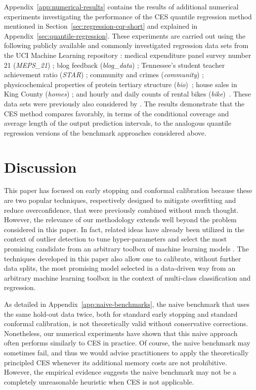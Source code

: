 Appendix~\ref{app:numerical-results} contains the results of additional numerical experiments investigating the performance of the CES quantile regression method mentioned in Section~\ref{sec:regression-cqr-short} and explained in Appendix~\ref{sec:quantile-regression}.
These experiments are carried out using the following publicly available and commonly investigated regression data sets from the UCI Machine Learning repository \cite{Pinar2012}: medical expenditure panel survey number 21 ({\em MEPS\_21}) \cite{meps_21}; blog feedback ({\em blog\_data}) \cite{blog_data}; Tennessee’s student teacher achievement ratio ({\em STAR}) \cite{star}; community and crimes ({\em community}) \cite{community}; physicochemical properties of protein tertiary structure ({\em bio})~\cite{data-bio}; house sales in King County ({\em homes}) \cite{homes}; and hourly and daily counts of rental bikes ({\em bike})~\cite{data-bike}. These data sets were previously also considered by \citet{romano2019conformalized}.
The results demonstrate that the CES method compares favorably, in terms of the conditional coverage and average length of the output prediction intervals, to the analogous quantile regression versions of the benchmark approaches considered above.


\section{Discussion} \label{sec:discussion}

This paper has focused on early stopping and conformal calibration because these are two popular techniques, respectively designed to mitigate overfitting and reduce overconfidence, that were previously combined without much thought. However, the relevance of our methodology extends well beyond the problem considered in this paper.
In fact, related ideas have already been utilized in the context of outlier detection to tune hyper-parameters and select the most promising candidate from an arbitrary toolbox of machine learning models \cite{Liang_2022_integrative_p_val}.
The techniques developed in this paper also allow one to calibrate, without further data splits, the most promising model selected in a data-driven way from an arbitrary machine learning toolbox in the context of multi-class classification and regression.

As detailed in Appendix~\ref{app:naive-benchmarks}, the naive benchmark that uses the same hold-out data twice, both for standard early stopping and standard conformal calibration, is not theoretically valid without conservative corrections. Nonetheless, our numerical experiments have shown that this naive approach often performs similarly to CES in practice.
Of course, the naive benchmark may sometimes fail, and thus we would advise practitioners to apply the theoretically principled CES whenever its additional memory costs are not prohibitive. However, the empirical evidence suggests the naive benchmark may not be a completely unreasonable heuristic when CES is not applicable.


